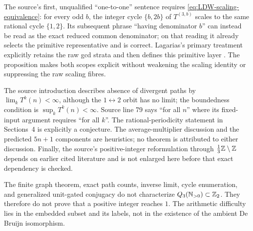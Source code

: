 The source's first, unqualified ``one-to-one'' sentence requires
\eqref{eq:LDW-scaling-equivalence}: for every odd $b$, the integer cycle
$\{b,2b\}$ of $T^{(3,b)}$ scales to the same rational cycle $\{1,2\}$.
Its subsequent phrase ``having denominator $b$'' can instead be read as the
exact reduced common denominator; on that reading it already selects the
primitive representative and is correct.  Lagarias's primary treatment
explicitly retains the raw gcd strata and then defines this primitive layer
\cite[pp.~39--40]{Lagarias1990}.  The proposition makes both scopes explicit
without weakening the scaling identity or suppressing the raw scaling
fibres.

\begin{sourceissue}
\label{issue:LDW-source-boundaries}
The source introduction describes absence of divergent paths by
$\lim_kT^k(n)<\infty$, although the $1\leftrightarrow2$ orbit has no limit;
the boundedness condition is $\sup_kT^k(n)<\infty$.  Source line 79 says
``for all $n$'' where its fixed-input argument requires ``for all $k$''.
The rational-periodicity statement in Sections~4 is explicitly a conjecture.
The average-multiplier discussion and the predicted $5n+1$ components are
heuristics; no theorem is attributed to either discussion.  Finally, the source's positive-integer
reformulation through $\frac13\mathbb{Z}\setminus\mathbb{Z}$ depends on earlier cited
literature and is not enlarged here before that exact dependency is checked.
\end{sourceissue}

\begin{nonclaim}
The finite graph theorem, exact path counts, inverse limit, cycle enumeration,
and generalized unit-gated conjugacy do not characterize
$Q_3(\mathbb{N}_{>0})\subset\mathbb{Z}_{2}$.  They therefore do not prove that a positive
integer reaches $1$.  The arithmetic difficulty lies in the embedded subset
and its labels, not in the existence of the ambient De Bruijn isomorphism.
\end{nonclaim}
